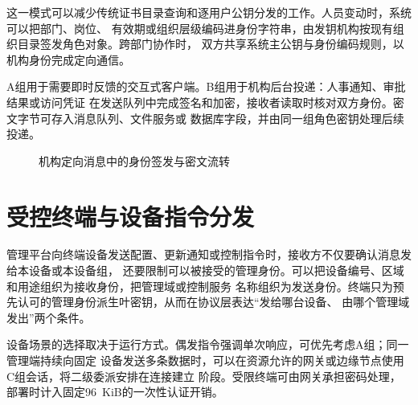 这一模式可以减少传统证书目录查询和逐用户公钥分发的工作。人员变动时，系统可以把部门、岗位、
有效期或组织层级编码进身份字符串，由发钥机构按现有组织目录签发角色对象。跨部门协作时，
双方共享系统主公钥与身份编码规则，以机构身份完成定向通信。

A组用于需要即时反馈的交互式客户端。B组用于机构后台投递：人事通知、审批结果或访问凭证
在发送队列中完成签名和加密，接收者读取时核对双方身份。密文字节可存入消息队列、文件服务或
数据库字段，并由同一组角色密钥处理后续投递。

\begin{figure}[H]
\centering
{}
\caption{机构定向消息中的身份签发与密文流转}
\label{fig:institutional-message}
\end{figure}

\section{受控终端与设备指令分发}

管理平台向终端设备发送配置、更新通知或控制指令时，接收方不仅要确认消息发给本设备或本设备组，
还要限制可以被接受的管理身份。可以把设备编号、区域和用途组织为接收身份，把管理域或控制服务
名称组织为发送身份。终端只为预先认可的管理身份派生叶密钥，从而在协议层表达“发给哪台设备、
由哪个管理域发出”两个条件。

设备场景的选择取决于运行方式。偶发指令强调单次响应，可优先考虑A组；同一管理端持续向固定
设备发送多条数据时，可以在资源允许的网关或边缘节点使用C组会话，将二级委派安排在连接建立
阶段。受限终端可由网关承担密码处理，部署时计入固定96~KiB的一次性认证开销。

